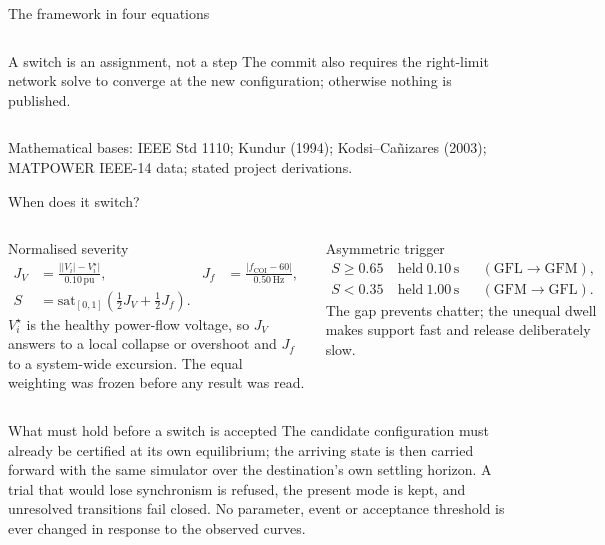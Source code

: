 \documentclass[aspectratio=169,10pt]{beamer}
\begin{document}
\begin{frame}[shrink=6]{The framework in four equations}
\begin{columns}[T,onlytextwidth]
\begin{block}{A switch is an assignment, not a step}
The commit also requires the right-limit network solve to converge at the new
configuration; otherwise nothing is published.
\end{block}
\end{columns}
{\scriptsize Mathematical bases: IEEE Std 1110; Kundur (1994); Kodsi--Ca\~nizares
(2003); MATPOWER IEEE-14 data; stated project derivations.}
\end{frame}

\begin{frame}[shrink=4]{When does it switch?}
\begin{columns}[T,onlytextwidth]
\begin{block}{Normalised severity}
\footnotesize
\vspace{-0.45em}\begin{align*}
J_V&=\frac{\bigl||V_i|-V_i^\star\bigr|}{0.10\,\mathrm{pu}}, &
J_f&=\frac{|f_{\mathrm{COI}}-60|}{0.50\,\mathrm{Hz}},\\
S&=\mathrm{sat}_{[0,1]}\!\left(\tfrac12J_V+\tfrac12J_f\right).
\end{align*}
\vspace{0em}
$V_i^\star$ is the healthy power-flow voltage, so $J_V$ answers to a local
collapse or overshoot and $J_f$ to a system-wide excursion. The equal
weighting was frozen before any result was read.
\end{block}
\begin{block}{Asymmetric trigger}
\footnotesize
\vspace{-0.45em}\begin{align*}
S\ge0.65&\ \text{held}\ 0.10\,\mathrm{s} &&(\mathrm{GFL}\to\mathrm{GFM}),\\
S<0.35&\ \text{held}\ 1.00\,\mathrm{s} &&(\mathrm{GFM}\to\mathrm{GFL}).
\end{align*}
\vspace{0em}
The gap prevents chatter; the unequal dwell makes support fast and release
deliberately slow.
\end{block}
\end{columns}
\vspace{0.15em}
\begin{alertblock}{What must hold before a switch is accepted}
\footnotesize
The candidate configuration must already be certified at its own equilibrium;
the arriving state is then carried forward with the same simulator over the
destination's own settling horizon. A trial that would lose synchronism is
refused, the present mode is kept, and unresolved transitions fail closed. No
parameter, event or acceptance threshold is ever changed in response to the
observed curves.
\end{alertblock}
\end{frame}
\end{document}
